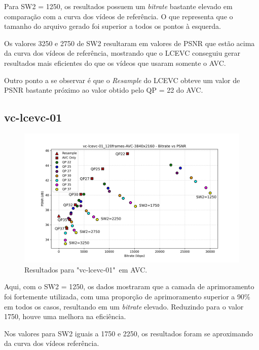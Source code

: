 Para SW2 = 1250, os resultados possuem um \textit{bitrate} bastante elevado em comparação com 
a curva dos vídeos de referência. O que representa que o tamanho do arquivo gerado foi superior
a todos os pontos à esquerda.

Os valores 3250 e 2750 de SW2 resultaram em valores de \acrshort{PSNR} que estão acima da curva
dos vídeos de referência, mostrando que o \acrshort{LCEVC} conseguiu gerar resultados mais
eficientes do que os vídeos que usaram somente o \acrshort{AVC}.

Outro ponto a se observar é que o \textit{Resample} do \acrshort{LCEVC} obteve um valor de 
\acrshort{PSNR} bastante próximo ao valor obtido pelo QP = 22 do \acrshort{AVC}.


\newpage

\subsection{vc-lcevc-01}

\begin{figure}[h]
    \centering
    \includegraphics[width=1.0\textwidth]{img/vc-lcevc-01_120frames-AVC.png}
    \caption{Resultados para "vc-lcevc-01"\ em \acrshort{AVC}.}
    \label{fig:vc-lcevc-01}
\end{figure}

Aqui, com o SW2 = 1250, os dados mostraram que a camada de aprimoramento foi fortemente
utilizada, com uma proporção de aprimoramento superior a 90\% em todos os casos, resultando
em um \textit{bitrate} elevado. Reduzindo para o valor 1750, houve uma melhora na eficiência.

Nos valores para SW2 iguais a 1750 e 2250, os resultados foram se aproximando da curva dos
vídeos referência.

